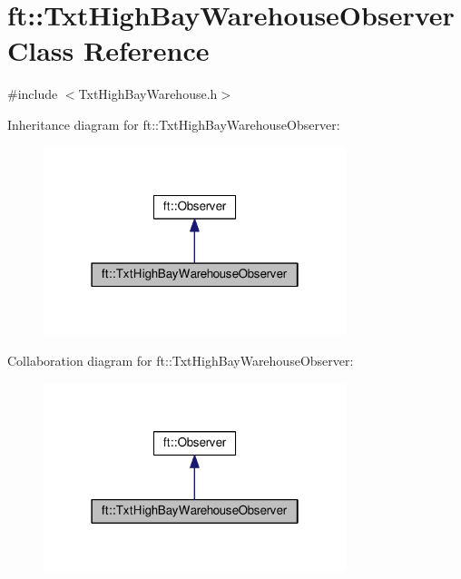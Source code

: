 \hypertarget{classft_1_1_txt_high_bay_warehouse_observer}{}\section{ft\+:\+:Txt\+High\+Bay\+Warehouse\+Observer Class Reference}
\label{classft_1_1_txt_high_bay_warehouse_observer}


{\ttfamily \#include $<$Txt\+High\+Bay\+Warehouse.\+h$>$}



Inheritance diagram for ft\+:\+:Txt\+High\+Bay\+Warehouse\+Observer\+:
\nopagebreak
\begin{figure}[H]
\begin{center}
\leavevmode
\includegraphics[width=250pt]{classft_1_1_txt_high_bay_warehouse_observer__inherit__graph}
\end{center}
\end{figure}


Collaboration diagram for ft\+:\+:Txt\+High\+Bay\+Warehouse\+Observer\+:
\nopagebreak
\begin{figure}[H]
\begin{center}
\leavevmode
\includegraphics[width=250pt]{classft_1_1_txt_high_bay_warehouse_observer__coll__graph}
\end{center}
\end{figure}
